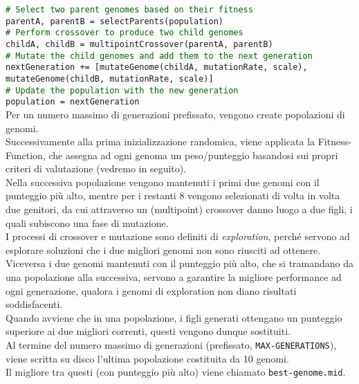 \documentclass[a4paper,12pt]{report}
\begin{document}
\indent\indent            \texttt{\small\textcolor{darkgreen}{\# Select two parent genomes based on their fitness}} \\
\indent\indent            \texttt{\small parentA, parentB = selectParents(population)} \\
\indent\indent            \texttt{\small\textcolor{darkgreen}{\# Perform crossover to produce two child genomes}} \\
\indent\indent            \texttt{\small childA, childB = multipointCrossover(parentA, parentB)} \\
\indent\indent            \texttt{\small\textcolor{darkgreen}{\# Mutate the child genomes and add them to the next generation}} \\
\indent\indent            \texttt{\small nextGeneration += [mutateGenome(childA, mutationRate, scale),} \\
\indent\indent            \texttt{\small mutateGenome(childB, mutationRate, scale)]} \\

\indent        \texttt{\small\textcolor{darkgreen}{\# Update the population with the new generation}} \\
\indent        \texttt{\small population = nextGeneration} \\
        
Per un numero massimo di generazioni prefissato, vengono create popolazioni di genomi. \\
Successivamente alla prima inizializzazione randomica, viene applicata la Fitness-Function, che assegna ad ogni genoma un peso/punteggio basandosi sui propri criteri di valutazione (vedremo in seguito). \\
Nella successiva popolazione vengono mantenuti i primi due genomi con il punteggio più alto, mentre per i restanti 8 vengono selezionati di volta in volta due genitori, da cui attraverso un (multipoint) crossover danno luogo a due figli, i quali subiscono una fase di mutazione. \\
I processi di crossover e mutazione sono definiti di \textit{exploration}, perché servono ad esplorare soluzioni che i due migliori genomi non sono riusciti ad ottenere. \\
Viceversa i due genomi mantenuti con il punteggio più alto, che si tramandano da una popolazione alla successiva, servono a garantire la migliore performance ad ogni generazione, qualora i genomi di exploration non diano risultati soddisfacenti. \\
Quando avviene che in una popolazione, i figli generati ottengano un punteggio superiore ai due migliori correnti, questi vengono dunque sostituiti. \\
Al termine del numero massimo di generazioni (prefissato, \texttt{MAX-GENERATIONS}), viene scritta su disco l'ultima popolazione costituita da 10 genomi. \\
Il migliore tra questi (con punteggio più alto) viene chiamato \texttt{best-genome.mid}. 
\end{document}
